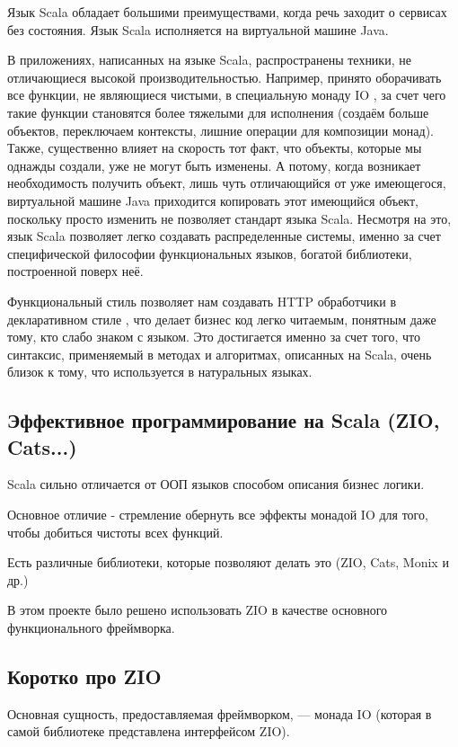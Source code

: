 \documentclass[14pt]{extarticle}
\begin{document}
    Язык Scala обладает большими преимуществами, когда речь заходит о сервисах без состояния. Язык Scala исполняется
    на виртуальной машине Java.

    В приложениях, написанных на языке Scala, распространены
    техники, не отличающиеся высокой производительностью. Например, принято оборачивать все функции, не являющиеся
    чистыми, в специальную монаду IO \cite{monad}, за счет чего такие функции становятся более тяжелыми для исполнения
        (создаём
    больше объектов, переключаем контексты, лишние операции для композиции монад). Также, существенно влияет на
    скорость тот факт, что объекты, которые мы однажды создали, уже не могут быть изменены. А потому, когда возникает
    необходимость получить объект, лишь чуть отличающийся от уже имеющегося, виртуальной машине Java приходится
    копировать этот имеющийся объект, поскольку просто изменить не позволяет стандарт языка Scala.
    Несмотря на это, язык Scala позволяет
    легко создавать распределенные
    системы, именно за счет
    специфической
    философии
    функциональных языков, богатой библиотеки, построенной поверх неё.

    Функциональный стиль позволяет нам создавать HTTP обработчики в декларативном стиле \cite{decl}, что делает бизнес код
    легко
    читаемым, понятным даже тому, кто слабо знаком с языком. Это достигается именно за счет того, что синтаксис,
    применяемый в
    методах и
    алгоритмах, описанных на Scala, очень близок к тому, что используется в натуральных языках. \cite{declnat}

    \subsection{Эффективное программирование на Scala (ZIO, Cats...)}

    Scala сильно отличается от ООП языков способом описания бизнес логики.

    Основное отличие - стремление обернуть все эффекты монадой IO для того, чтобы добиться чистоты всех функций.

    Есть различные библиотеки, которые позволяют делать это (ZIO, Cats, Monix и др.)

    В этом проекте было решено использовать ZIO\cite{zio}  в качестве основного функционального фреймворка.

    \subsection{Коротко про ZIO}
    Основная сущность, предоставляемая фреймворком, --- монада IO (которая в самой библиотеке представлена интерфейсом ZIO).
\end{document}

